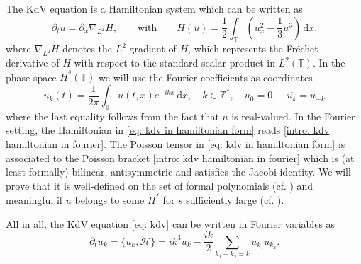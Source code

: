 \documentclass[a4paper,10pt,reqno]{article}
\theoremstyle{definition}
\theoremstyle{plain}
\theoremstyle{plain}
\theoremstyle{definition}
\theoremstyle{plain}
\theoremstyle{plain}
\theoremstyle{plain}
\theoremstyle{definition}
\theoremstyle{definition}
\def \Z{\mathbb Z}
\def \pa{{\partial}}
\def \T{\mathbb{T}}
\def \H{\mathcal{H}}
\def \M{\mathcal{M}}
\def \k{\bm{k}}
\begin{document}
The KdV equation is a Hamiltonian system which can be written as
\begin{equation}
\pa_t u = \pa_x \nabla_{L^2} H, \qquad \mbox{with}\qquad H(u) = \frac{1}{2} \int_{\T} ( u_x^2 - \frac{1}{3} u^3  ) \, \mathrm{d}x.
\label{eq: kdv in hamiltonian form}
\end{equation}
where $\nabla_{L^2} H$ denotes the $L^2$-gradient of $H$, which represents the Fr\'echet derivative of $H$ with respect to the standard scalar product in $L^2(\T)$. In the phase space $\dot{H}^s(\T)$ we will use the Fourier coefficients  as coordinates
\begin{equation}
u_k(t) = \frac{1}{2\pi} \int_{\T} u(t,x) e^{-ikx} \, \mathrm{d}x, \quad k \in \Z^*, \quad u_0 = 0, \quad \overline{u_k}=u_{-k}
\end{equation}
where the last equality follows from the fact that $u$ is real-valued.
In the Fourier setting, the Hamiltonian in \eqref{eq: kdv in hamiltonian form} reads \eqref{intro: kdv hamiltonian in fourier}.
The Poisson tensor in \eqref{eq: kdv in hamiltonian form} is associated to the Poisson bracket \eqref{intro: kdv hamiltonian in fourier}
which is (at least formally) bilinear, antisymmetric and satisfies the Jacobi identity.
We will prove that it is well-defined on the set of formal polynomials (cf. ) and meaningful if $u$ belongs to some $\dot{H}^s$ for $s$ sufficiently large (cf. ).

All in all, the KdV equation \eqref{eq: kdv} can be written in Fourier variables as
\begin{equation}
\pa_t u_k = \{ u_k , \H \} = i k^3 u_k - \frac{ik}{2} \sum_{k_1+k_2=k} u_{k_1} u_{k_2}.
\end{equation}
\end{document}
